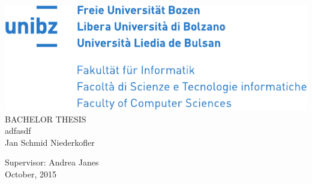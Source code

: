 \documentclass[12pt,a4paper,oneside]{book}
\begin{document}
\frontmatter

\newsavebox\MyArrowBox%
\sbox\MyArrowBox{$\hookleftarrow$}%
\makeatletter%
\newcommand*{\BreakableChar}{%
  \leavevmode%
  \prw@zbreak%
  \discretionary{\usebox\MyArrowBox}{}{}%
  \prw@zbreak%
}%

%
\newcommand{\url}[1]{%
  \texttt{%
  \StrLen{#1 }[\stringLength]%
  \forloop[1]{index}{1}{\value{index}<\stringLength}{%
    \StrChar{#1}{\value{index}}[\currentLetter]%
    {\currentLetter\BreakableChar}%
  }%
  }%
}%

\def\title{adfasdf}
\def\author{Jan Schmid Niederkofler}
\def\advisor{Andrea Janes}
\def\date{October, 2015}

\begin{titlepage}
\begin{center}\includegraphics[scale=1.4]{img/logo.pdf}\\\LARGE\vspace{80pt}BACHELOR THESIS\vspace{50pt}\\{\huge\title}\\\vspace{50pt}\author \end{center}\Large\begin{flushright}\vspace{90pt}Supervisor: \advisor\\\date\end{flushright}
\end{titlepage}

%

\tableofcontents
\listoftables
\listoffigures
\lstlistoflistings

\mainmatter


%
%
%
%
%
%
%

\appendix

                                 

\end{document}
